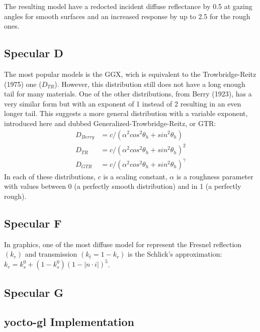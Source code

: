 \documentclass[11pt]{article}
\begin{document}
The resulting model have a redocted incident diffuse reflectance by 0.5 at gazing angles for smooth surfaces and an increased response by up to 2.5 for the rough ones.
\subsection{Specular D}
The most popular models is the GGX, wich is equivalent to the Trowbridge-Reitz (1975) one ($D_{TR}$). 
However, this distribution still does not have a long enough tail for many materials.
One of the other distributions, from Berry (1923), has a very similar
form but with an exponent of 1 instead of 2 resulting in an even longer tail. This suggests a more general
distribution with a variable exponent, introduced here and dubbed Generalized-Trowbridge-Reitz, or
GTR:
\begin{align*}
  D_{Berry} &= c/(\alpha^2 cos^2\theta_h + sin^2\theta_h) \\
  D_{TR} &= c/(\alpha^2 cos^2\theta_h + sin^2\theta_h)^2 \\
  D_{GTR} &= c/(\alpha^2 cos^2\theta_h + sin^2\theta_h)^\gamma
\end{align*}
 In each of these distributions, $\textit{c}$ is a scaling constant, $\alpha$ is a roughness parameter with values between 0 (a perfectly smooth distribution) and in 1 (a perfectly rough).
\subsection{Specular F}
In graphics, one of the most diffuse model for represent the Fresnel reflection $ (k_r) $ and transmission $ (k_t = 1 - k_r) $ is the Schlick's approximation:
$ k_r = k_s^0 + (1 - k_s^0)(1 - | n\cdot i|)^5$.
\subsection{Specular G}
\subsection{yocto-gl Implementation}
\end{document}
